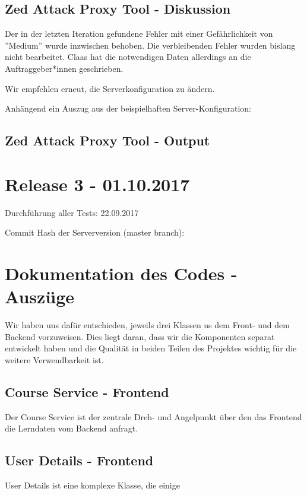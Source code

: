 \documentclass[accentcolor=tud0b,12pt,paper=a4]{tudreport}
\begin{document}
\subsection*{Zed Attack Proxy Tool - Diskussion}
Der in der letzten Iteration gefundene Fehler mit einer Gefährlichkeit von ''Medium'' wurde inzwischen behoben. Die verbleibenden Fehler wurden bislang nicht bearbeitet. Claas hat die notwendigen Daten allerdings an die Auftraggeber*innen geschrieben.

Wir empfehlen erneut, die Serverkonfiguration zu ändern.

Anhängend ein Auszug aus der beispielhaften Server-Konfiguration:



\subsection*{Zed Attack Proxy Tool - Output}



\section*{Release 3 - 01.10.2017}
Durchführung aller Tests: 22.09.2017

Commit Hash der Serverversion (master branch): 

\section*{Dokumentation des Codes - Auszüge}

Wir haben uns dafür entschieden, jeweils drei Klassen us dem Front- und dem Backend vorzuweisen. Dies liegt daran, dass wir die Komponenten separat entwickelt haben und die Qualität in beiden Teilen des Projektes wichtig für die weitere Verwendbarkeit ist.

\subsection*{Course Service - Frontend}
Der Course Service ist der zentrale Dreh- und Angelpunkt über den das Frontend die Lerndaten vom Backend anfragt.



\subsection*{User Details - Frontend}
User Details ist eine komplexe Klasse, die einige 
\end{document}
